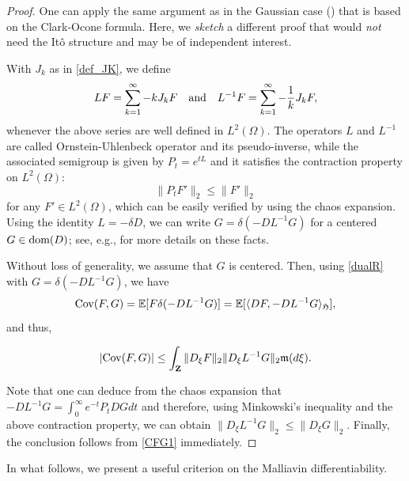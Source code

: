 \documentclass[letterpaper, 11pt,  reqno]{amsart}
\newcommand{\noi}{\noindent}
\newcommand{\E}{\mathbb{E}}
\newcommand{\dl}{\delta}
\renewcommand{\O}{\Omega}
\newcommand{\fm}{\mathfrak{m}}
\newcommand{\fH}{\mathfrak{H}}
\newcommand{\dom}{\textup{dom}}
\numberwithin{equation}{section}
\numberwithin{theorem}{section}
\begin{document}
\begin{proof} 
One can  apply  the same argument as in the Gaussian case (\cite[Proposition 6.3]{CKNP21})
that is based on the Clark-Ocone formula. 
Here, we  {\it sketch}  a different proof that would {\it not} need the It\^o structure and may be 
of independent interest.  

With $J_k$ as in \eqref{def_JK}, 
we define 
\[
L F = \sum_{k=1}^\infty -k J_k F \quad {\rm and}\quad
L^{-1} F = \sum_{k=1}^\infty -\frac{1}{k} J_k F,
\]
whenever the above series are well defined in $L^2(\O)$. The operators $L$ and $L^{-1}$
are called Ornstein-Uhlenbeck operator and its pseudo-inverse, while the associated
semigroup is given by $P_t = e^{tL}$ and it satisfies 
the contraction property on $L^2(\O)$:
\[
\|P_t F'\|_2 \leq \|F'\|_2
\]
 for any $F'\in L^2(\Omega)$, which can be easily verified by using the chaos expansion. 
Using the identity $L = -\dl D$, 
we can write  $G=\delta(-DL^{-1}G)$ for a centered $G\in\dom(D)$; 
see, e.g., \cite{PSTU10} for more details
on these facts.


Without loss of generality, we assume that $G$ is centered. Then,
using \eqref{dualR} with  $G=\delta(-DL^{-1}G)$, 
we have 
 \[
 {\rm Cov}(F, G) = \E[  F \delta(-DL^{-1}G)    ] = \E[ \langle DF, - DL^{-1}G \rangle_{\fH}],
 \] 
 and thus, 
 
 \noi
  \begin{align} \label{CFG1}
  |{\rm Cov}(F, G)|\leq \int_{\mathbf{Z}} \|D_{\xi}F\|_2 \| D_{\xi}L^{-1}G\|_2 \fm(d\xi).
  \end{align}
  
  \noi
 Note that one can deduce from the chaos expansion that $-DL^{-1}G = \int_0^\infty e^{-t} P_t DGdt$
 and therefore, using Minkowski's inequality and the above contraction property,
 we can obtain 
 $\| D_{\xi} L^{-1}G \|_2 \leq \|D_{\xi} G\|_2$.
 Finally,   the conclusion follows from \eqref{CFG1} immediately.
 \qedhere
 
 
 
\end{proof}


In what follows, we present a useful criterion on the Malliavin differentiability. 
\end{document}
